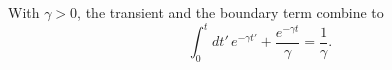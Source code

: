 \documentclass{article}
\begin{document}
With $\gamma>0$, the transient and the boundary term combine to
\begin{equation}
\int_0^{t} dt'\, e^{-\gamma t'} + \frac{e^{-\gamma t}}{\gamma} = \frac{1}{\gamma} .
\label{eq:scope}
\end{equation}
\end{document}

